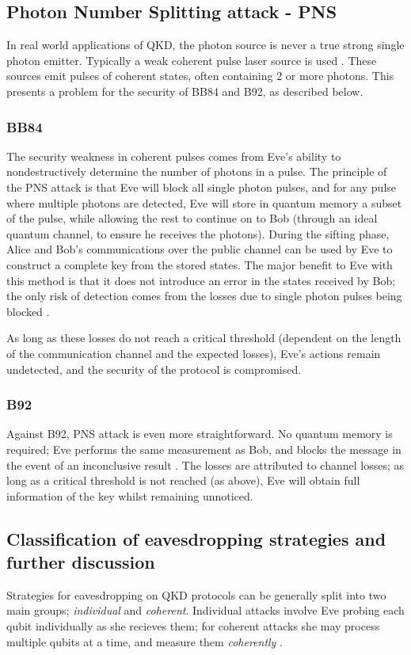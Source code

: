 \documentclass[paper=a4, fontsize=11pt]{scrartcl} %
\numberwithin{equation}{section} %
\numberwithin{figure}{section} %
\numberwithin{table}{section} %
\begin{document}
\subsection{Photon Number Splitting attack - PNS}
In real world applications of QKD, the photon source is never a true strong single photon emitter. Typically
a weak coherent pulse laser source is used \citep{satellites}.
These sources emit pulses of coherent states, often containing 2 or more photons.
This presents a problem for the security of BB84 and B92, as described below.

\subsubsection*{BB84}
The security weakness in coherent pulses comes from Eve's ability to nondestructively determine the number of photons
in a pulse. The principle of the PNS attack is that Eve will block all single photon pulses, and for any pulse where
multiple photons are detected, Eve will store in quantum memory a subset of the pulse, while allowing the rest to continue
on to Bob (through an ideal quantum channel, to ensure he receives the photons). During the sifting
phase, Alice and Bob's communications over the public channel can be used by Eve to construct
a complete key from the stored states. The major benefit to Eve with this method is that it does not introduce an error in the
states received by Bob; the only risk of detection comes from the losses due to single photon pulses being blocked \citep{kronberg2009}.

As long as these losses do not reach a critical threshold (dependent on the length of the communication channel and the expected losses),
Eve's actions remain undetected, and the security of the protocol is compromised.


\subsubsection*{B92}
Against B92, PNS attack is even more straightforward. No quantum memory is required; Eve performs
the same measurement as Bob, and blocks the message in the event of an inconclusive result \citep{kronberg2009}. The losses are attributed
to channel losses; as long as a critical threshold is not reached (as above), Eve will obtain full information of the key whilst remaining unnoticed.

\subsection{Classification of eavesdropping strategies and further discussion}
Strategies for eavesdropping on QKD protocols can be generally split into two main groups;
\textit{individual} and \textit{coherent}. Individual attacks involve
Eve probing each qubit individually as she recieves them; for coherent attacks
she may process multiple qubits at a time, and measure them \textit{coherently} \citep{gisin2002}.
\end{document}

